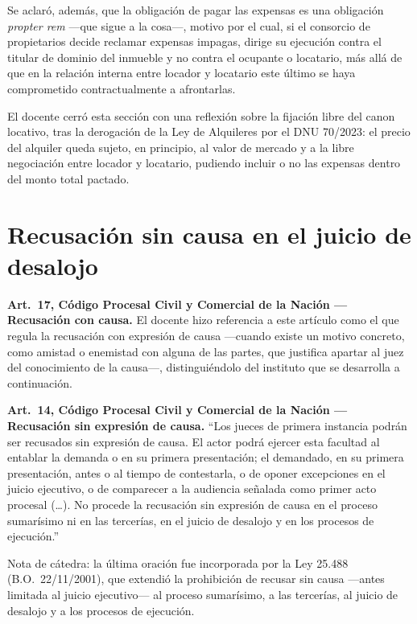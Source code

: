 \documentclass[12pt,oneside]{book}
\begin{document}
Se aclaró, además, que la obligación de pagar las expensas es una obligación \textit{propter rem} —que sigue a la cosa—, motivo por el cual, si el consorcio de propietarios decide reclamar expensas impagas, dirige su ejecución contra el titular de dominio del inmueble y no contra el ocupante o locatario, más allá de que en la relación interna entre locador y locatario este último se haya comprometido contractualmente a afrontarlas.

El docente cerró esta sección con una reflexión sobre la fijación libre del canon locativo, tras la derogación de la Ley de Alquileres por el DNU 70/2023: el precio del alquiler queda sujeto, en principio, al valor de mercado y a la libre negociación entre locador y locatario, pudiendo incluir o no las expensas dentro del monto total pactado.

\section{Recusación sin causa en el juicio de desalojo}

\begin{note}
\textbf{Art.\ 17, Código Procesal Civil y Comercial de la Nación — Recusación con causa.} El docente hizo referencia a este artículo como el que regula la recusación con expresión de causa —cuando existe un motivo concreto, como amistad o enemistad con alguna de las partes, que justifica apartar al juez del conocimiento de la causa—, distinguiéndolo del instituto que se desarrolla a continuación.
\end{note}

\begin{important}
\textbf{Art.\ 14, Código Procesal Civil y Comercial de la Nación — Recusación sin expresión de causa.} ``Los jueces de primera instancia podrán ser recusados sin expresión de causa. El actor podrá ejercer esta facultad al entablar la demanda o en su primera presentación; el demandado, en su primera presentación, antes o al tiempo de contestarla, o de oponer excepciones en el juicio ejecutivo, o de comparecer a la audiencia señalada como primer acto procesal (\ldots). No procede la recusación sin expresión de causa en el proceso sumarísimo ni en las tercerías, en el juicio de desalojo y en los procesos de ejecución.''

Nota de cátedra: la última oración fue incorporada por la Ley 25.488 (B.O.\ 22/11/2001), que extendió la prohibición de recusar sin causa —antes limitada al juicio ejecutivo— al proceso sumarísimo, a las tercerías, al juicio de desalojo y a los procesos de ejecución.
\end{important}
\end{document}
